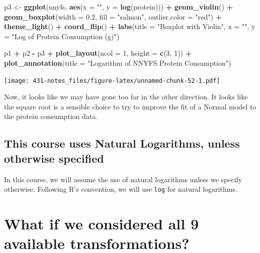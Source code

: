 \documentclass[
]{book}
\newenvironment{Shaded}{\begin{snugshade}}{\end{snugshade}}
\newcommand{\DataTypeTok}[1]{\textcolor[rgb]{0.13,0.29,0.53}{#1}}
\newcommand{\DecValTok}[1]{\textcolor[rgb]{0.00,0.00,0.81}{#1}}
\newcommand{\FloatTok}[1]{\textcolor[rgb]{0.00,0.00,0.81}{#1}}
\newcommand{\KeywordTok}[1]{\textcolor[rgb]{0.13,0.29,0.53}{\textbf{#1}}}
\newcommand{\NormalTok}[1]{#1}
\newcommand{\OperatorTok}[1]{\textcolor[rgb]{0.81,0.36,0.00}{\textbf{#1}}}
\newcommand{\StringTok}[1]{\textcolor[rgb]{0.31,0.60,0.02}{#1}}
\begin{document}
\begin{Shaded}
\begin{Highlighting}[]
\NormalTok{p3 <-}\StringTok{ }\KeywordTok{ggplot}\NormalTok{(nnyfs, }\KeywordTok{aes}\NormalTok{(}\DataTypeTok{x =} \StringTok{""}\NormalTok{, }\DataTypeTok{y =} \KeywordTok{log}\NormalTok{(protein))) }\OperatorTok{+}
\StringTok{    }\KeywordTok{geom_violin}\NormalTok{() }\OperatorTok{+}
\StringTok{    }\KeywordTok{geom_boxplot}\NormalTok{(}\DataTypeTok{width =} \FloatTok{0.2}\NormalTok{, }\DataTypeTok{fill =} \StringTok{"salmon"}\NormalTok{, }
                 \DataTypeTok{outlier.color =} \StringTok{"red"}\NormalTok{) }\OperatorTok{+}
\StringTok{    }\KeywordTok{theme_light}\NormalTok{() }\OperatorTok{+}
\StringTok{    }\KeywordTok{coord_flip}\NormalTok{() }\OperatorTok{+}
\StringTok{    }\KeywordTok{labs}\NormalTok{(}\DataTypeTok{title =} \StringTok{"Boxplot with Violin"}\NormalTok{,}
         \DataTypeTok{x =} \StringTok{""}\NormalTok{, }\DataTypeTok{y =} \StringTok{"Log of Protein Consumption (g)"}\NormalTok{)}

\NormalTok{p1 }\OperatorTok{+}\StringTok{ }\NormalTok{p2 }\OperatorTok{-}\StringTok{ }\NormalTok{p3 }\OperatorTok{+}\StringTok{ }\KeywordTok{plot_layout}\NormalTok{(}\DataTypeTok{ncol =} \DecValTok{1}\NormalTok{, }\DataTypeTok{height =} \KeywordTok{c}\NormalTok{(}\DecValTok{3}\NormalTok{, }\DecValTok{1}\NormalTok{)) }\OperatorTok{+}
\StringTok{    }\KeywordTok{plot_annotation}\NormalTok{(}\DataTypeTok{title =} \StringTok{"Logarithm of NNYFS Protein Consumption"}\NormalTok{)}
\end{Highlighting}
\end{Shaded}

\texttt{[image: 431-notes\_files/figure-latex/unnamed-chunk-52-1.pdf]}

Now, it looks like we may have gone too far in the other direction. It looks like the square root is a sensible choice to try to improve the fit of a Normal model to the protein consumption data.

\hypertarget{this-course-uses-natural-logarithms-unless-otherwise-specified}{%
\subsection{This course uses Natural Logarithms, unless otherwise specified}\label{this-course-uses-natural-logarithms-unless-otherwise-specified}}

In this course, we will assume the use of natural logarithms unless we specify otherwise. Following R's convention, we will use \texttt{log} for natural logarithms.

\hypertarget{what-if-we-considered-all-9-available-transformations}{%
\section{What if we considered all 9 available transformations?}\label{what-if-we-considered-all-9-available-transformations}}
\end{document}
